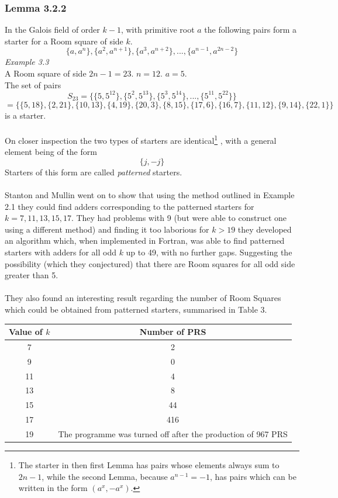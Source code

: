 \documentclass[
  12pt,
  a4paper]{book}
\begin{document}
\hypertarget{lemma-3.2.2}{%
\subsubsection{Lemma 3.2.2}\label{lemma-3.2.2}}

In the Galois field of order \(k-1\), with primitive root \(a\) the
following pairs form a starter for a Room square of side \(k\).
\[\{a,a^n\},\{a^2,a^{n+1}\},\{a^3,a^{n+2}\},...,\{a^{n-1},a^{2n-2}\}\]
\emph{Example 3.3}\\
A Room square of side \(2n-1=23\). \(n=12\). \(a=5\).\\
The set of pairs
\[S_{23}=\{\{5,5^{12}\},\{5^2,5^{13}\},\{5^3,5^{14}\},...,\{5^{11},5^{22}\}\}\]
\[=\{\{5,18\},\{2,21\},\{10,13\},\{4,19\},\{20,3\},\{8,15\},\{17,6\},\{16,7\},\{11,12\},\{9,14\},\{22,1\}\}\]
is a starter.\\
~\\
On closer inspection the two types of starters are identical\footnote{The starter in then first Lemma has pairs whose elements always
  sum to \(2n-1\), while the second Lemma, because \(a^{n-1}=-1\), has
  pairs which can be written in the form \((a^x,-a^x)\).} , with
a general element being of the form \[\{j,-j\}\] Starters of this form
are called \emph{patterned} starters.\\
~\\
Stanton and Mullin went on to show that using the method outlined in
Example 2.1 they could find adders corresponding to the patterned
starters for \(k=7,11,13,15,17\). They had problems with 9 (but were able
to construct one using a different method) and finding it too laborious
for \(k>19\) they developed an algorithm which, when implemented in
Fortran, was able to find patterned starters with adders for all odd \(k\)
up to 49, with no further gaps. Suggesting the possibility (which they
conjectured) that there are Room squares for all odd side greater than
5.\\
~\\
They also found an interesting result regarding the number of Room
Squares which could be obtained from patterned starters, summarised in
Table 3.

\begin{longtable}[]{@{}cc@{}}
\toprule
Value of \(k\) & Number of PRS\tabularnewline
\midrule
\endhead
7 & 2\tabularnewline
9 & 0\tabularnewline
11 & 4\tabularnewline
13 & 8\tabularnewline
15 & 44\tabularnewline
17 & 416\tabularnewline
19 & The programme was turned off after the production of 967 PRS\tabularnewline
\bottomrule
\end{longtable}
\end{document}
